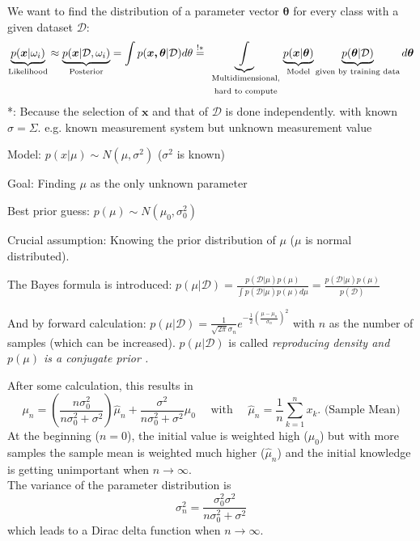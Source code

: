   We want to find the distribution of a parameter vector $\bm{\theta}$ for every class with a given dataset $\mathcal{D}$:
  $$\underbrace{p(\bm x |\omega_i)}_{\text{Likelihood}}\approx \underbrace{p(\bm{x}|\mathcal{D},\omega_i)}_{\text{Posterior}} = \int{p(\bm{x,\theta}|\mathcal{D}) d \theta}\overset{!*}{=}
  \underbrace{\int}_{\text{
  	\parbox{2.3cm}{\centering 
  		Multidimensional, hard to compute}}  
	}
  \underbrace{p(\bm{x}|\bm{\theta})}_{\text{Model}} 
  \underbrace{p(\bm{\theta}|\mathcal{D})}_{\text{given by training data}} d\bm{\theta}$$
 *: Because the selection of $\bm{x}$ and that of $\mathcal{D}$ is done independently.
  with known $\sigma=\Sigma$. e.g. known measurement system but unknown measurement value\\
  \begin{aufzaehlung}
    \item Model: $p(x|\mu) \sim N(\mu, \sigma^2)$ ($\sigma^2$ is known)
    \item Goal: Finding $\mu$ as the only unknown parameter
    \item Best prior guess: $p(\mu) \sim N(\mu_0, \sigma_0^2)$
    \item Crucial assumption: Knowing the prior distribution of $\mu$ ($\mu$ is normal distributed).
    \item The Bayes formula is introduced: 
      $p(\mu|\mathcal{D}) = \frac{p(\mathcal{D}|\mu) p(\mu)}{\int p(\mathcal{D}|\mu) p(\mu) d\mu} = \frac{p(\mathcal{D}|\mu) p(\mu)}{p(\mathcal{D})}$
    \item And by forward calculation: 
      $p(\mu|\mathcal{D}) = \frac{1}{\sqrt{2\pi} \sigma_n} e^{-\frac12 (\frac{\mu-\mu_n}{\sigma_n})^2}$
      with $n$ as the number of samples (which can be increased). 
      $p(\mu|\mathcal{D})$ is called \em reproducing density \em and $p(\mu)$ is a \em conjugate prior \em.
    \item After some calculation, this results in
      $$\mu_n = (\frac{n\sigma_0^2}{n\sigma_0^2 + \sigma^2})\hat{\mu}_n + 
      \frac{\sigma^2}{n\sigma_0^2 + \sigma^2} \mu_0 \quad \text{ with } \quad
      \hat{\mu}_n = \frac1n \sum\limits_{k=1}^{n}x_k. \text{ (Sample Mean)}$$
      At the beginning ($n=0$), the initial value is weighted high ($\mu_0$) but with more samples
      the sample mean is weighted much higher ($\hat{\mu}_n$) and the initial knowledge is getting 
      unimportant when $n \rightarrow \infty$.\\
      The variance of the parameter distribution is
      $$\sigma_n^2 = \frac{\sigma_0^2 \sigma^2}{n\sigma_0^2 + \sigma^2}$$
      which leads to a Dirac delta function when $n \rightarrow \infty$.
  \end{aufzaehlung}
  
